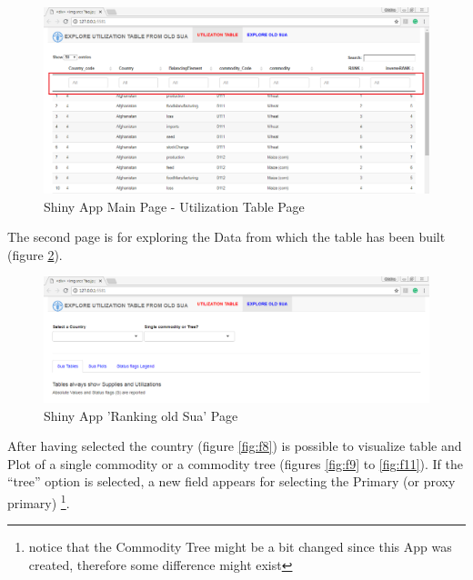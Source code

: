 \documentclass[]{article}
\let\rmarkdownfootnote\footnote%
\def\footnote{\protect\rmarkdownfootnote}
\begin{document}
\begin{figure}[H]

{\centering \includegraphics[width=1\linewidth]{images/UtilizationTable/06_Browser1} 

}

\caption{\label{fig:f6}Shiny App Main Page - Utilization Table Page}\label{fig:f6}
\end{figure}

The second page is for exploring the Data from which the table has been
built (figure \ref{fig:f7}).

\begin{figure}[H]

{\centering \includegraphics[width=1\linewidth]{images/UtilizationTable/07_Browser2_explore} 

}

\caption{\label{fig:f7}Shiny App 'Ranking old Sua' Page}\label{fig:f7}
\end{figure}

After having selected the country (figure \ref{fig:f8}) is possible to
visualize table and Plot of a single commodity or a commodity tree
(figures \ref{fig:f9} to \ref{fig:f11}). If the ``tree'' option is
selected, a new field appears for selecting the Primary (or proxy
primary) \footnote{notice that the Commodity Tree might be a bit changed
  since this App was created, therefore some difference might exist}.
\end{document}
